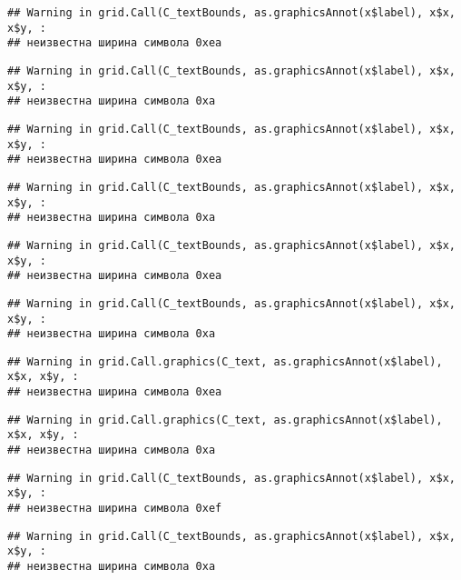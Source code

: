 \documentclass[
]{article}
\begin{document}
\begin{verbatim}
## Warning in grid.Call(C_textBounds, as.graphicsAnnot(x$label), x$x, x$y, :
## неизвестна ширина символа 0xea
\end{verbatim}

\begin{verbatim}
## Warning in grid.Call(C_textBounds, as.graphicsAnnot(x$label), x$x, x$y, :
## неизвестна ширина символа 0xa
\end{verbatim}

\begin{verbatim}
## Warning in grid.Call(C_textBounds, as.graphicsAnnot(x$label), x$x, x$y, :
## неизвестна ширина символа 0xea
\end{verbatim}

\begin{verbatim}
## Warning in grid.Call(C_textBounds, as.graphicsAnnot(x$label), x$x, x$y, :
## неизвестна ширина символа 0xa
\end{verbatim}

\begin{verbatim}
## Warning in grid.Call(C_textBounds, as.graphicsAnnot(x$label), x$x, x$y, :
## неизвестна ширина символа 0xea
\end{verbatim}

\begin{verbatim}
## Warning in grid.Call(C_textBounds, as.graphicsAnnot(x$label), x$x, x$y, :
## неизвестна ширина символа 0xa
\end{verbatim}

\begin{verbatim}
## Warning in grid.Call.graphics(C_text, as.graphicsAnnot(x$label), x$x, x$y, :
## неизвестна ширина символа 0xea
\end{verbatim}

\begin{verbatim}
## Warning in grid.Call.graphics(C_text, as.graphicsAnnot(x$label), x$x, x$y, :
## неизвестна ширина символа 0xa
\end{verbatim}

\begin{verbatim}
## Warning in grid.Call(C_textBounds, as.graphicsAnnot(x$label), x$x, x$y, :
## неизвестна ширина символа 0xef
\end{verbatim}

\begin{verbatim}
## Warning in grid.Call(C_textBounds, as.graphicsAnnot(x$label), x$x, x$y, :
## неизвестна ширина символа 0xa
\end{verbatim}
\end{document}
